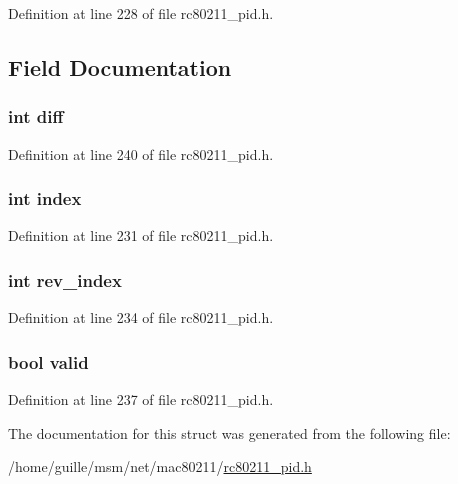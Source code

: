 Definition at line 228 of file rc80211\-\_\-pid.\-h.



\subsection{Field Documentation}
\hypertarget{structrc__pid__rateinfo_a65f3a8178e1f997a7a19a988bb0f4e1a}{
\subsubsection[{diff}]{\setlength{\rightskip}{0pt plus 5cm}int diff}}\label{structrc__pid__rateinfo_a65f3a8178e1f997a7a19a988bb0f4e1a}


Definition at line 240 of file rc80211\-\_\-pid.\-h.

\hypertarget{structrc__pid__rateinfo_a750b5d744c39a06bfb13e6eb010e35d0}{
\subsubsection[{index}]{\setlength{\rightskip}{0pt plus 5cm}int index}}\label{structrc__pid__rateinfo_a750b5d744c39a06bfb13e6eb010e35d0}


Definition at line 231 of file rc80211\-\_\-pid.\-h.

\hypertarget{structrc__pid__rateinfo_ab2a252c7807fa54334cd1bbc0ec2d894}{
\subsubsection[{rev\-\_\-index}]{\setlength{\rightskip}{0pt plus 5cm}int rev\-\_\-index}}\label{structrc__pid__rateinfo_ab2a252c7807fa54334cd1bbc0ec2d894}


Definition at line 234 of file rc80211\-\_\-pid.\-h.

\hypertarget{structrc__pid__rateinfo_a28e3c179a86f337095088b3ca02a2b2a}{
\subsubsection[{valid}]{\setlength{\rightskip}{0pt plus 5cm}bool valid}}\label{structrc__pid__rateinfo_a28e3c179a86f337095088b3ca02a2b2a}


Definition at line 237 of file rc80211\-\_\-pid.\-h.



The documentation for this struct was generated from the following file\-:\begin{DoxyCompactItemize}
\item 
/home/guille/msm/net/mac80211/\hyperlink{rc80211__pid_8h}{rc80211\-\_\-pid.\-h}\end{DoxyCompactItemize}
